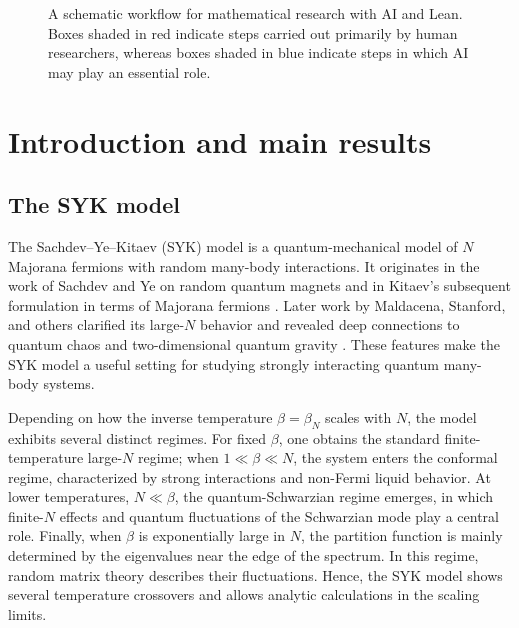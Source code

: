\documentclass[../CLT_SYK.tex]{subfiles}
\begin{document}
\begin{figure}[t]
{
    }
    \caption{
        A schematic workflow for mathematical research with AI and Lean.
Boxes shaded in red indicate steps carried out primarily by human researchers,
whereas boxes shaded in blue indicate steps in which AI may play an essential role.
    }
    \label{fig:workflow}
\end{figure}


\section{Introduction and main results}
\label{sec:introduction}



\subsection{The SYK model}\label{subsec:SYK-model}
The Sachdev--Ye--Kitaev (SYK) model is a quantum-mechanical model of \(N\) Majorana fermions with random many-body interactions. It originates in the work of Sachdev and Ye on random quantum magnets \cite{SachdevYe1993} and in Kitaev’s subsequent formulation in terms of Majorana fermions \cite{Kitaev2015}. Later work by Maldacena, Stanford, and others clarified its large-\(N\) behavior and revealed deep connections to quantum chaos and two-dimensional quantum gravity \cite{MaldacenaStanford2016}. These features make the SYK model a useful setting for studying strongly interacting quantum many-body systems.

Depending on how the inverse temperature \(\beta=\beta_N\) scales with \(N\), the model exhibits several distinct regimes. For fixed \(\beta\), one obtains the standard finite-temperature large-\(N\) regime; when \(1\ll \beta\ll N\), the system enters the conformal regime, characterized by strong interactions and non-Fermi liquid behavior. At lower temperatures, \(N\ll \beta\), the quantum-Schwarzian regime emerges, in which finite-\(N\) effects and quantum fluctuations of the Schwarzian mode play a central role. Finally, when \(\beta\) is exponentially large in \(N\), the partition function is mainly determined by the eigenvalues near the edge of the spectrum. In this regime, random matrix theory  describes their fluctuations. Hence, the SYK model shows several temperature crossovers and allows analytic calculations in the scaling limits.
\end{document}
